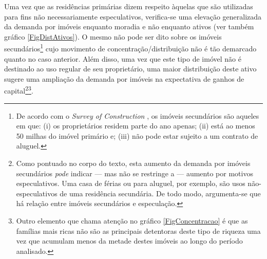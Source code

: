 Uma vez que as residências primárias dizem respeito àquelas que são utilizadas para fins não necessariamente especulativos, verifica-se uma elevação generalizada da demanda por imóveis enquanto moradia e não enquanto ativos (ver também gráfico \ref{FigDistAtivos}).
O mesmo não pode ser dito sobre os imóveis secundários\footnote{
	De acordo com o \textit{Survey of Construction} \cite{us_census_bureau_characteristics_2017}, os imóveis secundários são aqueles em que: (i) os proprietários residem parte do ano apenas; (ii) está ao menos 50 milhas do imóvel primário e; (iii) não pode estar sujeito a um contrato de aluguel.
} cujo movimento de concentração/distribuição não é tão demarcado quanto no caso anterior.
Além disso, uma vez que este tipo de imóvel não é destinado ao uso regular de seu proprietário, uma maior distribuição deste ativo sugere uma ampliação da demanda por imóveis na expectativa de ganhos de capital\footnote{
	Como pontuado no corpo do texto, esta aumento da demanda por imóveis secundários \textit{pode} indicar --- mas não se restringe a --- aumento por motivos especulativos. Uma casa de férias ou para aluguel, por exemplo, são usos não-especulativos de uma residência secundária.
	De todo modo, argumenta-se que há relação entre imóveis secundários e especulação.
}\footnote{Outro elemento que chama atenção no gráfico \ref{FigConcentracao} é que as famílias mais ricas não são as principais detentoras deste tipo de riqueza uma vez que acumulam menos da metade destes imóveis ao longo do período analisado.}.





